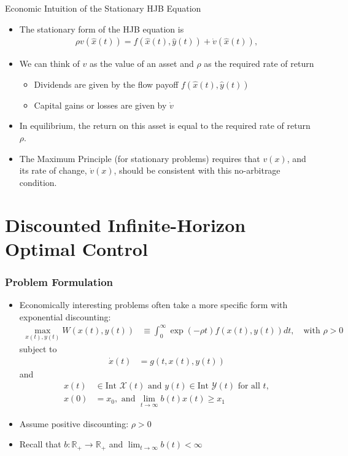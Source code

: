 \documentclass[9pt,aspectratio=169]{beamer}
\newcommand{\X}{\mathcal{X}}
\newcommand{\Y}{\mathcal{Y}}
\begin{document}
\begin{frame}{Economic Intuition of the Stationary HJB Equation}
    \begin{itemize}
        \item The stationary form of the HJB equation is
        \begin{align}
            \rho v(\hat{x}(t)) = f(\hat{x}(t), \hat{y}(t)) +
            \dot{v}(\hat{x}(t)), \tag{7.48} 
        \end{align}
        \item We can think of $v$ as the value of an asset and $\rho$ as the
        required rate of return
        \begin{itemize}
            \item Dividends are given by the flow payoff $f(\hat{x}(t), \hat{y}(t))$
            \item Capital gains or losses are given by $\dot{v}$
        \end{itemize}
        \item In equilibrium, the return on this asset is equal to the
        required rate of return $\rho$.
        \item The Maximum Principle (for stationary problems) requires that
        $v(x)$, and its rate of change, $\dot{v}(x)$, should be consistent
        with this no-arbitrage condition.
    \end{itemize}
\end{frame}

\section{Discounted Infinite-Horizon Optimal Control}

\begin{frame}
\frametitle{Problem Formulation}
\begin{itemize}
    \item Economically interesting problems often take a more specific form
    with exponential discounting:
    \begin{align}
        \max_{x(t),y(t)} W(x(t), y(t)) &\equiv \int_0^\infty \exp(-\rho
        t)f(x(t), y(t))dt, \quad \text{with } \rho > 0 \tag{7.60} 
    \end{align}
    subject to
    \begin{align}
        \dot{x}(t) &= g(t, x(t), y(t)) \tag{7.61}
    \end{align}
    and
    \begin{align}
        x(t) &\in \text{Int } \X(t) \text{ and } y(t) \in \text{Int } \Y(t) \text{ for all } t, \nonumber \\
        x(0) &= x_0, \text{ and } \lim_{t\to\infty} b(t)x(t) \geq x_1 \tag{7.62}
    \end{align}
    \item Assume positive discounting: $\rho > 0$
    \item Recall that $b : \mathbb{R}_+ \to \mathbb{R}_+$ and
    $\lim_{t\to\infty} b(t) < \infty$
\end{itemize}
\end{frame}
\end{document}
